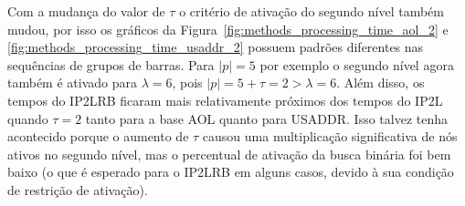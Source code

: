 Com a mudança do valor de $\tau$ o critério de ativação do segundo nível também mudou, por isso os gráficos da Figura~\ref{fig:methods_processing_time_aol_2} e \ref{fig:methods_processing_time_usaddr_2} possuem padrões diferentes nas sequências de grupos de barras. Para $|p|=5$ por exemplo o segundo nível agora também é ativado para $\lambda=6$, pois $|p|=5 + \tau=2 > \lambda=6$. Além disso, os tempos do IP2LRB ficaram mais relativamente próximos dos tempos do IP2L quando $\tau=2$ tanto para a base AOL quanto para USADDR. Isso talvez tenha acontecido porque o aumento de $\tau$ causou uma multiplicação significativa de nós ativos no segundo nível, mas o percentual de ativação da busca binária foi bem baixo (o que é esperado para o IP2LRB em alguns casos, devido à sua condição de restrição de ativação). 

